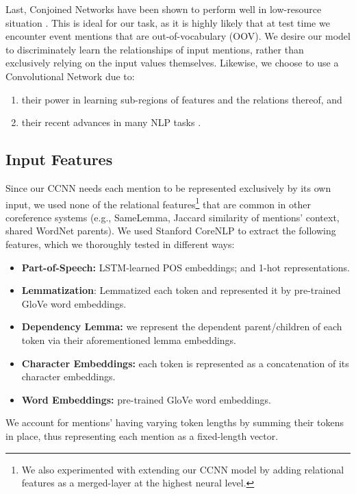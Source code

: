 Last, Conjoined Networks have been shown to perform well in low-resource situation \cite{Koch2015SiameseNN}.  This is ideal for our task, as it is highly likely that at test time we encounter event mentions that are out-of-vocabulary (OOV).  We desire our model to discriminately learn the relationships of input mentions, rather than exclusively relying on the input values themselves.  Likewise, we choose to use a Convolutional Network due to:
\begin{enumerate}
\item their power in learning sub-regions of features and the relations thereof, and
\item their recent advances in many NLP tasks \cite{DBLP:conf/emnlp/Kim14,DBLP:conf/acl/GehringAGD17,DBLP:journals/corr/YuV17}.
\end{enumerate}

\subsection{Input Features}
\label{sec:features}
Since our CCNN needs each mention to be represented exclusively by its own input, we used none of the relational features\footnote{We also experimented with extending our CCNN model by adding relational features as a merged-layer at the highest neural level.} that are common in other coreference systems (e.g., SameLemma, Jaccard similarity of mentions' context, shared WordNet parents).  We used Stanford CoreNLP \cite{manning-EtAl:2014:P14-5} to extract the following features, which we thoroughly tested in different ways:
\begin{itemize}
  \item \textbf{Part-of-Speech:} LSTM-learned POS embeddings; and 1-hot representations.
  \item \textbf{Lemmatization}: Lemmatized each token and represented it by pre-trained GloVe \cite{pennington2014glove} word embeddings.
  \item \textbf{Dependency Lemma:} we represent the dependent parent/children of each token via their aforementioned lemma embeddings.
  \item \textbf{Character Embeddings:} each token is represented as a concatenation of its character embeddings.
  \item \textbf{Word Embeddings:} pre-trained GloVe word embeddings.
\end{itemize}
We account for mentions' having varying token lengths by summing their tokens in place, thus representing each mention as a fixed-length vector.

